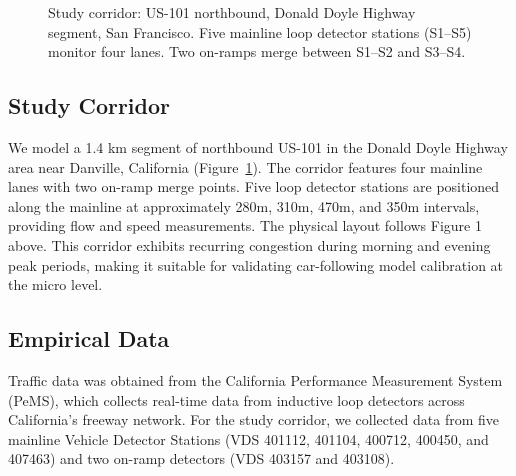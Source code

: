 \documentclass{scspaperproc}
\theoremstyle{scsthe}
\begin{document}
\begin{figure}[H]
        \caption{Study corridor: US-101 northbound, Donald Doyle Highway segment, San Francisco. Five mainline loop detector stations (S1--S5) monitor four lanes. Two on-ramps merge between S1--S2 and S3--S4.}
        \label{fig:corridor}
    \end{figure}

    \subsection{Study Corridor}
    We model a 1.4 km segment of northbound US-101 in the Donald Doyle Highway area  near Danville, California (Figure~\ref{fig:corridor}). The corridor features four mainline lanes with two on-ramp merge points. Five loop detector stations are positioned along the mainline at approximately 280m, 310m, 470m, and 350m intervals, providing flow and speed measurements.
    The physical layout follows Figure 1 above. This corridor exhibits recurring congestion
    during morning and evening peak periods, making it suitable for validating car-following model calibration at the micro level.
    \subsection{Empirical Data}
    Traffic data was obtained from the California Performance Measurement System (PeMS),
    which collects real-time data from inductive loop detectors across California's freeway network. For the study corridor, we collected data from five mainline Vehicle Detector Stations (VDS 401112, 401104, 400712, 400450, and 407463) and two on-ramp detectors (VDS 403157 and 403108).
\end{document}
